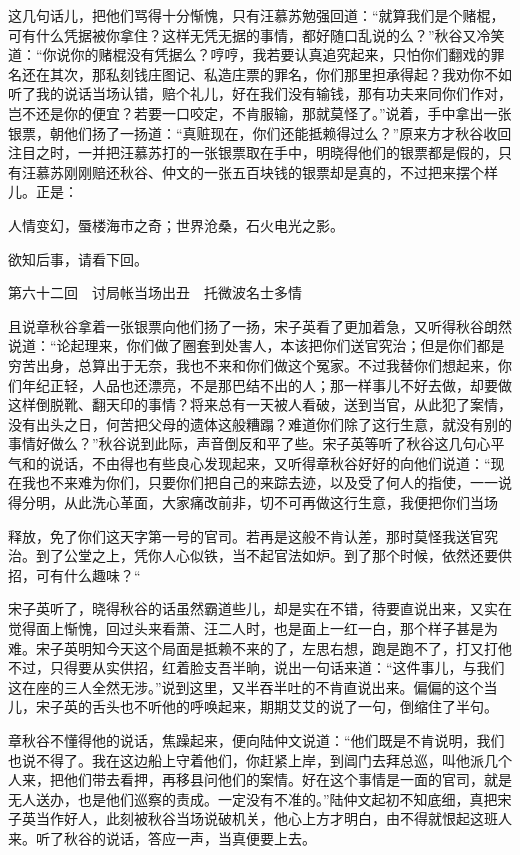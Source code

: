 \documentclass[12pt,UTF8]{ctexbook}
\begin{document}
{{{这几句话儿，把他们骂得十分惭愧，只有汪慕苏勉强回道：“就算我们是个赌棍，可有什么凭据被你拿住？这样无凭无据的事情，都好随口乱说的么？”秋谷又冷笑道：“你说你的赌棍没有凭据么？哼哼，我若要认真追究起来，只怕你们翻戏的罪名还在其次，那私刻钱庄图记、私造庄票的罪名，你们那里担承得起？我劝你不如听了我的说话当场认错，赔个礼儿，好在我们没有输钱，那有功夫来同你们作对，岂不还是你的便宜？若要一口咬定，不肯服输，那就莫怪了。”说着，手中拿出一张银票，朝他们扬了一扬道：“真赃现在，你们还能抵赖得过么？”原来方才秋谷收回注目之时，一并把汪慕苏打的一张银票取在手中，明晓得他们的银票都是假的，只有汪慕苏刚刚赔还秋谷、仲文的一张五百块钱的银票却是真的，不过把来摆个样儿。正是：

人情变幻，蜃楼海市之奇；世界沧桑，石火电光之影。

欲知后事，请看下回。





第六十二回　讨局帐当场出丑　托微波名士多情





且说章秋谷拿着一张银票向他们扬了一扬，宋子英看了更加着急，又听得秋谷朗然说道：“论起理来，你们做了圈套到处害人，本该把你们送官究治；但是你们都是穷苦出身，总算出于无奈，我也不来和你们做这个冤家。不过我替你们想起来，你们年纪正轻，人品也还漂亮，不是那巴结不出的人；那一样事儿不好去做，却要做这样倒脱靴、翻天印的事情？将来总有一天被人看破，送到当官，从此犯了案情，没有出头之日，何苦把父母的遗体这般糟蹋？难道你们除了这行生意，就没有别的事情好做么？”秋谷说到此际，声音倒反和平了些。宋子英等听了秋谷这几句心平气和的说话，不由得也有些良心发现起来，又听得章秋谷好好的向他们说道：“现在我也不来难为你们，只要你们把自己的来踪去迹，以及受了何人的指使，一一说得分明，从此洗心革面，大家痛改前非，切不可再做这行生意，我便把你们当场

释放，免了你们这天字第一号的官司。若再是这般不肯认差，那时莫怪我送官究治。到了公堂之上，凭你人心似铁，当不起官法如炉。到了那个时候，依然还要供招，可有什么趣味？“

宋子英听了，晓得秋谷的话虽然霸道些儿，却是实在不错，待要直说出来，又实在觉得面上惭愧，回过头来看萧、汪二人时，也是面上一红一白，那个样子甚是为难。宋子英明知今天这个局面是抵赖不来的了，左思右想，跑是跑不了，打又打他不过，只得要从实供招，红着脸支吾半晌，说出一句话来道：“这件事儿，与我们这在座的三人全然无涉。”说到这里，又半吞半吐的不肯直说出来。偏偏的这个当儿，宋子英的舌头也不听他的呼唤起来，期期艾艾的说了一句，倒缩住了半句。

章秋谷不懂得他的说话，焦躁起来，便向陆仲文说道：“他们既是不肯说明，我们也说不得了。我在这边船上守着他们，你赶紧上岸，到阊门去拜总巡，叫他派几个人来，把他们带去看押，再移县问他们的案情。好在这个事情是一面的官司，就是无人送办，也是他们巡察的责成。一定没有不准的。”陆仲文起初不知底细，真把宋子英当作好人，此刻被秋谷当场说破机关，他心上方才明白，由不得就恨起这班人来。听了秋谷的说话，答应一声，当真便要上去。

}}}
\end{document}
